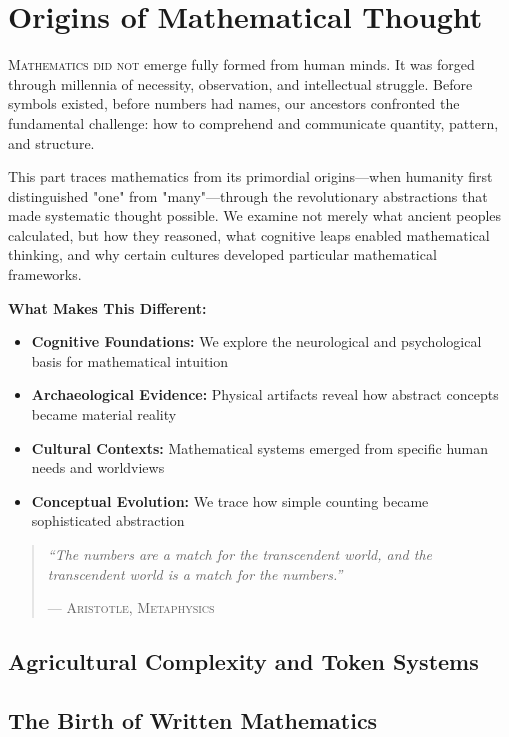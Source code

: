 \part{Origins of Mathematical Thought}
\label{part:origins}

\begin{partintro}
\lettrine[lines=3]{M}{athematics did not} emerge fully formed from human minds. It was forged through millennia of necessity, observation, and intellectual struggle. Before symbols existed, before numbers had names, our ancestors confronted the fundamental challenge: how to comprehend and communicate quantity, pattern, and structure.

This part traces mathematics from its primordial origins—when humanity first distinguished "one" from "many"—through the revolutionary abstractions that made systematic thought possible. We examine not merely what ancient peoples calculated, but how they reasoned, what cognitive leaps enabled mathematical thinking, and why certain cultures developed particular mathematical frameworks.

\vspace{1em}
\textbf{What Makes This Different:}
\begin{itemize}[noitemsep]
    \item \textbf{Cognitive Foundations:} We explore the neurological and psychological basis for mathematical intuition
    \item \textbf{Archaeological Evidence:} Physical artifacts reveal how abstract concepts became material reality
    \item \textbf{Cultural Contexts:} Mathematical systems emerged from specific human needs and worldviews
    \item \textbf{Conceptual Evolution:} We trace how simple counting became sophisticated abstraction
\end{itemize}

\begin{quote}
\textit{``The numbers are a match for the transcendent world, and the transcendent world is a match for the numbers.''}

\hfill--- \textsc{Aristotle, Metaphysics}
\end{quote}
\end{partintro}



\chapter{Agricultural Complexity and Token Systems}
\chapter{The Birth of Written Mathematics}